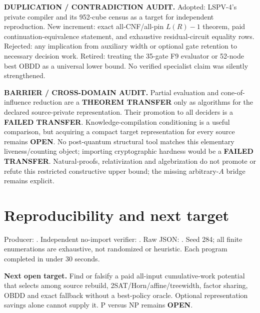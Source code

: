 \documentclass[11pt]{article}
\begin{document}
\noindent\textbf{DUPLICATION / CONTRADICTION AUDIT.} Adopted: LSPV-4's private compiler and its 952-cube census as a target for independent reproduction. New increment: exact all-CNF/all-pin $L(R)-1$ theorem, paid continuation-equivalence statement, and exhaustive residual-circuit equality rows. Rejected: any implication from auxiliary width or optional gate retention to necessary decision work. Retired: treating the 35-gate F9 evaluator or 52-node best OBDD as a universal lower bound. No verified specialist claim was silently strengthened.

\noindent\textbf{BARRIER / CROSS-DOMAIN AUDIT.} Partial evaluation and cone-of-influence reduction are a \textbf{THEOREM TRANSFER} only as algorithms for the declared source-private representation. Their promotion to all deciders is a \textbf{FAILED TRANSFER}. Knowledge-compilation conditioning is a useful comparison, but acquiring a compact target representation for every source remains \textbf{OPEN}. No post-quantum structural tool matches this elementary liveness/counting object; importing cryptographic hardness would be a \textbf{FAILED TRANSFER}. Natural-proofs, relativization and algebrization do not promote or refute this restricted constructive upper bound; the missing arbitrary-$A$ bridge remains explicit.

\section{Reproducibility and next target}
Producer: . Independent no-import verifier: . Raw JSON: . Seed 284; all finite enumerations are exhaustive, not randomized or heuristic. Each program completed in under 30 seconds.

\noindent\textbf{Next open target.} Find or falsify a paid all-input cumulative-work potential that selects among source rebuild, 2SAT/Horn/affine/treewidth, factor sharing, OBDD and exact fallback without a best-policy oracle. Optional representation savings alone cannot supply it. P versus NP remains \textbf{OPEN}.
\end{document}
